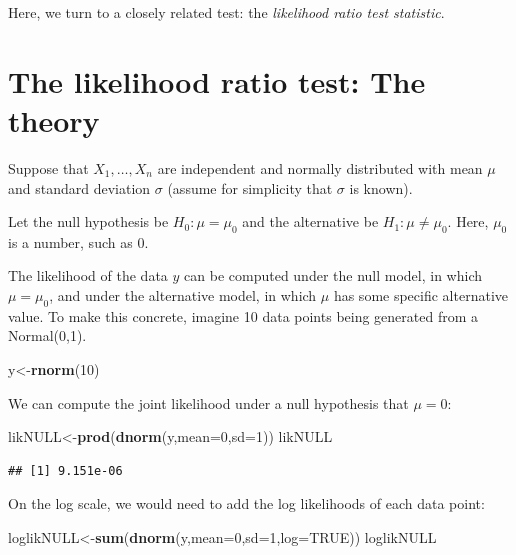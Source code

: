 \documentclass[12pt,]{krantz}
\newenvironment{Shaded}{\begin{snugshade}}{\end{snugshade}}
\newcommand{\DataTypeTok}[1]{\textcolor[rgb]{0.13,0.29,0.53}{#1}}
\newcommand{\DecValTok}[1]{\textcolor[rgb]{0.00,0.00,0.81}{#1}}
\newcommand{\KeywordTok}[1]{\textcolor[rgb]{0.13,0.29,0.53}{\textbf{#1}}}
\newcommand{\NormalTok}[1]{#1}
\newcommand{\OtherTok}[1]{\textcolor[rgb]{0.56,0.35,0.01}{#1}}
\begin{document}
Here, we turn to a closely related test: the \emph{likelihood ratio test statistic}.

\hypertarget{the-likelihood-ratio-test-the-theory}{%
\section{The likelihood ratio test: The theory}\label{the-likelihood-ratio-test-the-theory}}

Suppose that \(X_1,\dots, X_n\) are independent and normally distributed with mean \(\mu\) and standard deviation \(\sigma\) (assume for simplicity that \(\sigma\) is known).

Let the null hypothesis be \(H_0: \mu=\mu_0\) and the alternative be \(H_1: \mu\neq \mu_0\). Here, \(\mu_0\) is a number, such as \(0\).

The likelihood of the data \(y\) can be computed under the null model, in which \(\mu=\mu_0\), and under the alternative model, in which \(\mu\) has some specific alternative value. To make this concrete, imagine 10 data points being generated from a Normal(0,1).

\begin{Shaded}
\begin{Highlighting}[]
\NormalTok{y<-}\KeywordTok{rnorm}\NormalTok{(}\DecValTok{10}\NormalTok{)}
\end{Highlighting}
\end{Shaded}

We can compute the joint likelihood under a null hypothesis that \(\mu=0\):

\begin{Shaded}
\begin{Highlighting}[]
\NormalTok{likNULL<-}\KeywordTok{prod}\NormalTok{(}\KeywordTok{dnorm}\NormalTok{(y,}\DataTypeTok{mean=}\DecValTok{0}\NormalTok{,}\DataTypeTok{sd=}\DecValTok{1}\NormalTok{))}
\NormalTok{likNULL}
\end{Highlighting}
\end{Shaded}

\begin{verbatim}
## [1] 9.151e-06
\end{verbatim}

On the log scale, we would need to add the log likelihoods of each data point:

\begin{Shaded}
\begin{Highlighting}[]
\NormalTok{loglikNULL<-}\KeywordTok{sum}\NormalTok{(}\KeywordTok{dnorm}\NormalTok{(y,}\DataTypeTok{mean=}\DecValTok{0}\NormalTok{,}\DataTypeTok{sd=}\DecValTok{1}\NormalTok{,}\DataTypeTok{log=}\OtherTok{TRUE}\NormalTok{))}
\NormalTok{loglikNULL}
\end{Highlighting}
\end{Shaded}
\end{document}
